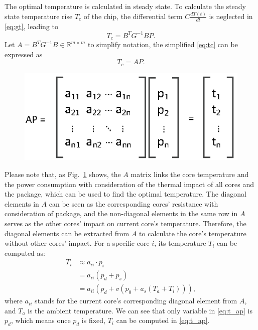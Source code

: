 The optimal temperature is calculated in steady state. To calculate the steady state temperature rise $T_{c}$ of the chip, the differential term $C\frac{dT(t)}{dt}$ is neglected in 
\eqref{eq:gt}, leading to
\begin{equation}\label{eq:tc}
T_{c} = B^{T}G^{-1}BP.
\end{equation}
Let $A = B^{T}G^{-1}B \in \mathbb{R}^{m \times m}$ to simplify notation, the simplified 
\eqref{eq:tc} can be expressed as
\begin{equation}\label{sim_tc}
T_{c} = AP.
\end{equation}

\begin{figure}
\centering
\includegraphics[width=1\linewidth]{fig/ap.eps}\label{fig:apt}
\end{figure}


Please note that, as Fig.~\ref{fig:apt} shows, the $A$ matrix links the core temperature and the power consumption with consideration of the thermal impact of all cores and the package, which can be used to find the optimal temperature. The diagonal elements in $A$ can be seen as the corresponding cores' resistance with consideration of package, and the non-diagonal elements in the same row in $A$ serves as the other cores' impact on current core's temperature. Therefore, the diagonal elements can be extracted from $A$ to calculate the core's temperature without other cores' impact. For a specific core $i$, its temperature $T_{i}$ can be computed as:
\begin{equation}\label{eq:t_ap}
\begin{split}
T_{i}&\approx a_{ii} \cdot p_{i}\\
&=a_{ii}(p_{d}+p_{s})\\
&=a_{ii}(p_{d}+v (p_{0}+a_{s}(T_{a}+T_{i}))),
\end{split}
\end{equation}
where $a_{ii}$ stands for the current core's corresponding diagonal element from $A$, and $T_{a}$ is the ambient temperature. We can see that only variable in \eqref{eq:t_ap} is $p_{d}$, which means once $p_{d}$ is fixed, $T_{i}$ can be computed in \eqref{eq:t_ap}.

